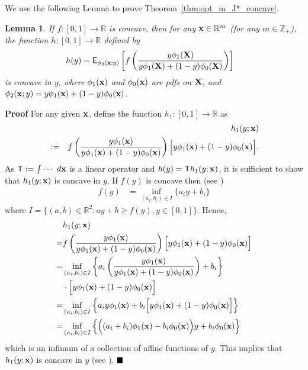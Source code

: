 \documentclass[journal]{IEEEtran}
\newtheorem{lemma}{Lemma}
\begin{document}
We use the following Lemma to prove
Theorem~\ref{thm:opt_m_J*_concave}.
\begin{lemma}
\label{lem:Lemma01}
If $f:[0,1] \to \mathbb{R}$ is concave, then for any ${\bf x} \in
{\mathbb R}^m$ (for any $m \in \mathbb{Z}_+$), the function 
$h:[0,1] \to \mathbb{R}$ defined  by 
\begin{align*} 
h(y) & = {\mathsf E}_{
\phi_2({\bf x};y)	
	}\left[f\left(\frac{y \phi_1({\bf X})}{y \phi_1({\bf X}) + (1-y)\phi_0({\bf X}) }\right) \right]   
\end{align*}
is concave in $y$, where $\phi_1({\bf x})$ and $\phi_0({\bf x})$ are pdfs on ${\bf X}$, and $\phi_2({\bf x};y) = y\phi_1({\bf x})+(1-y)\phi_0({\bf x})$.
\end{lemma}
\noindent
{\bf Proof } 
For any given ${\bf x}$, define the function $h_1:[0,1] \to \mathbb{R}$ as
\begin{eqnarray*}
&    & h_1(y; {\bf x})\\ 
& := & f\left(\frac{y \phi_1({\bf x})}{y \phi_1({\bf x}) + (1-y)\phi_0({\bf x}) }\right) \Big[y \phi_1({\bf x}) + (1-y)\phi_0({\bf x})\Big]. 
\end{eqnarray*}
As ${\mathsf T} := \int \cdots \ d{\bf x}$ is a linear operator and
$h(y) = \mathsf T h_1(y;{\bf x})$, it is sufficient to show that 
$h_1(y; {\bf x})$ is concave in $y$.
If $f(y)$ is concave then (see \cite{rockafellar})
\begin{align*} 
f(y) & = \inf_{(a_i, b_i) \in I} \big\{a_i y + b_i\big\}
\end{align*}
where $I = \{(a,b)\in\mathbb{R}^2: ay + b \ge f(y), y \in [0,1] \}$.  
Hence,
{
\begin{align*} 
& h_1(y;{\bf x}) \\
 = &f\left(\frac{y \phi_1({\bf x})}{y \phi_1({\bf x}) + (1-y)\phi_0({\bf x}) }\right)\Big[y \phi_1({\bf x}) + (1-y)\phi_0({\bf x})\Big] \\
 = & \inf_{(a_i, b_i) \in I} \left\{a_i \left(\frac{y \phi_1({\bf x})}{y
 \phi_1({\bf x}) + (1-y)\phi_0({\bf x}) }\right) + b_i\right\}\\
  & \cdot \Big[y \phi_1({\bf x}) + (1-y)\phi_0({\bf x}
)\Big] \\
 = & \inf_{(a_i, b_i) \in I} \left\{a_i y \phi_1({\bf x}) + b_i \Big[y \phi_1({\bf x}) + (1-y)\phi_0({\bf x})\Big] \right\} \\
 = & \inf_{(a_i, b_i) \in I} \left\{\Big((a_i+b_i) \phi_1({\bf x}) - b_i \phi_0({\bf x}
)\Big)y + b_i\phi_0({\bf x}) \right\} 
\end{align*}
}
which is an infimum of a collection of affine functions of $y$. This
implies that $h_1(y;{\bf x})$ is concave in $y$ (see
\cite{rockafellar}). 
$\hfill\blacksquare$
\end{document}
